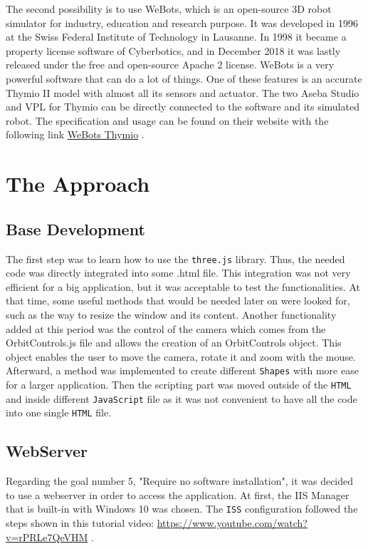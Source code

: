 \documentclass{scrreprt}
\begin{document}
The second possibility is to use WeBots, which is an open-source 3D robot simulator for industry, education and research purpose. 
It was developed in 1996 at the Swiss Federal Institute of Technology in Lausanne. In 1998 it became a property license software of Cyberbotics, 
and in December 2018 it was lastly released under the free and open-source Apache 2 license.
WeBots is a very powerful software that can do a lot of things. One of these features is an accurate Thymio II model with almost all its sensors and actuator. 
The two Aseba Studio and VPL for Thymio can be directly connected to the software and its simulated robot. 
The specification and usage can be found on their website with the following link \href{https://www.cyberbotics.com/doc/guide/thymio2#mosybas-thymio-ii}{WeBots Thymio} .

\chapter{The Approach}

\section{Base Development}

The first step was to learn how to use the \texttt{three.js} library. Thus, the needed code was directly integrated into some .html file. This integration was not very efficient for a big application, but it was acceptable to test the functionalities. 
At that time, some useful methods that would be needed later on were looked for, such as the way to resize the window and its content. Another functionality added at this period was the control of the camera which comes from the OrbitControls.js file and allows the creation of an OrbitControls object. This object enables the user to move the camera, rotate it and zoom with the mouse.
Afterward, a method was implemented to create different \texttt{Shapes} with more ease for a larger application. Then the scripting part was moved outside of the \texttt{HTML} and inside different \texttt{JavaScript} file as it was not convenient to have all the code into one single \texttt{HTML} file.

\section{WebServer \label{webserver}}
Regarding the goal number 5, "Require no software installation", it was decided to use a webserver in order to access the application. At first, the IIS Manager that is built-in with Windows 10 was chosen.  
The \texttt{ISS} configuration followed the steps shown in this tutorial video: \url{https://www.youtube.com/watch?v=rPRLe7QeVHM} .
\end{document}
